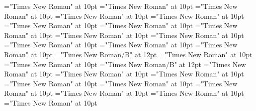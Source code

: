 \documentclass[gps1,twoside]{article}
\begin{document}
\font\spansummarydefinitionminorentrycomplexfirstchildbefore="Times New Roman" at 10pt
\font\spansummarydefinitionminorentrycomplexlastchildafter="Times New Roman" at 10pt
\font\spanspanvisiblecomplexformbackrefsminorentrycomplexbefore="Times New Roman" at 10pt
\font\visiblecomplexformbackrefsminorentrycomplexbefore="Times New Roman" at 10pt
\font\visiblecomplexformbackrefsminorentrycomplexafter="Times New Roman" at 10pt
\font\complexformtypesvisiblecomplexformbackrefvisiblecomplexformbackrefsminorentrycomplexafter="Times New Roman" at 10pt
\font\spanspanreverseabbrcomplexformtypecomplexformtypesvisiblecomplexformbackrefvisiblecomplexformbackrefsminorentrycomplexbefore="Times New Roman" at 10pt
\font\spanspanheadwordvisiblecomplexformbackrefvisiblecomplexformbackrefsminorentrycomplexbefore="Times New Roman" at 10pt
\font\spanspandefinitionorglossesvisiblecomplexformbackrefvisiblecomplexformbackrefsminorentrycomplexbefore="Times New Roman" at 10pt
\font{}="Times New Roman" at 10pt
\font\spanspanowningentrysummarydefinitionvisiblecomplexformbackrefvisiblecomplexformbackrefsminorentrycomplexbefore="Times New Roman" at 10pt
\font\spanowningentrysummarydefinitionvisiblecomplexformbackrefvisiblecomplexformbackrefsminorentrycomplexfirstchildbefore="Times New Roman" at 10pt
\font\spanowningentrysummarydefinitionvisiblecomplexformbackrefvisiblecomplexformbackrefsminorentrycomplexlastchildafter="Times New Roman" at 10pt
\font\spanbzhheadwordminorentryvariant="Times New Roman/B" at 12pt
\font\spanspanheadwordminorentryvariantbefore="Times New Roman" at 10pt
\font\spanheadwordminorentryvariantlastchildafter="Times New Roman" at 10pt
\font\spanheadwordminorentryvariant="Times New Roman/B" at 12pt
\font\pronunciationpronunciationpronunciationsminorentryvariantbefore="Times New Roman" at 10pt
\font\pronunciationsminorentryvariantafter="Times New Roman" at 10pt
\font\spanspanformpronunciationpronunciationsminorentryvariantbefore="Times New Roman" at 10pt
\font\spanformpronunciationpronunciationsminorentryvariantfirstchildbefore="Times New Roman" at 10pt
\font\spanformpronunciationpronunciationsminorentryvariantlastchildafter="Times New Roman" at 10pt
\font\spanspanvariantformentrybackrefsminorentryvariantbefore="Times New Roman" at 10pt
\font\variantformentrybackrefsminorentryvariantbefore="Times New Roman" at 10pt
\font\variantformentrybackrefsminorentryvariantafter="Times New Roman" at 10pt
\font\variantentrytypevariantentrytypevariantentrytypesvariantformentrybackrefvariantformentrybackrefsminorentryvariantbefore="Times New Roman" at 10pt
\end{document}
